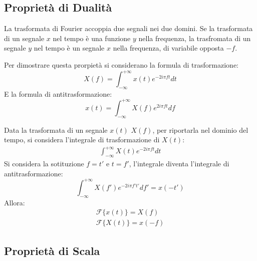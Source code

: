 \documentclass{article}
\numberwithin{equation}{subsection}
\begin{document}
\subsection{Proprietà di Dualità}

La trasformata di Fourier accoppia due segnali nei due domini. Se la trasformata di un segnale $x$ nel tempo è una funzione $y$ nella frequenza, la trasfromata di un segnale $y$ 
nel tempo è un segnale $x$ nella frequenza, di variabile opposta $-f$.

Per dimostrare questa prorpietà si considerano la formula di trasformazione:
\begin{equation*}
    X(f)=\displaystyle\int_{-\infty}^{+\infty}x(t)e^{-2i\pi ft}dt
\end{equation*}
E la formula di antitrasformazione:
\begin{equation*}
    x(t)=\displaystyle\int_{-\infty}^{+\infty}X(f)e^{2i\pi ft}df
\end{equation*}

Data la trasformata di un segnale $x(t)$ $X(f)$, per riportarla nel dominio del tempo, si considera l'integrale di trasformazione di $X(t)$:
\begin{gather*}
    \displaystyle\int_{-\infty}^{+\infty}X(t)e^{-2i\pi ft}dt
\end{gather*}
Si considera la sotituzione $f=t'$ e $t=f'$, l'integrale diventa l'integrale di antitrasformazione:
\begin{equation*}
    \displaystyle\int_{-\infty}^{+\infty}X(f')e^{-2i\pi f't'}df'=x(-t')
\end{equation*}
Allora:
\begin{gather*}
    \mathscr{F}\{x(t)\}= X(f)\\
    \mathscr{F}\{X(t)\}=x(-f)
\end{gather*}

\subsection{Proprietà di Scala}
\end{document}
